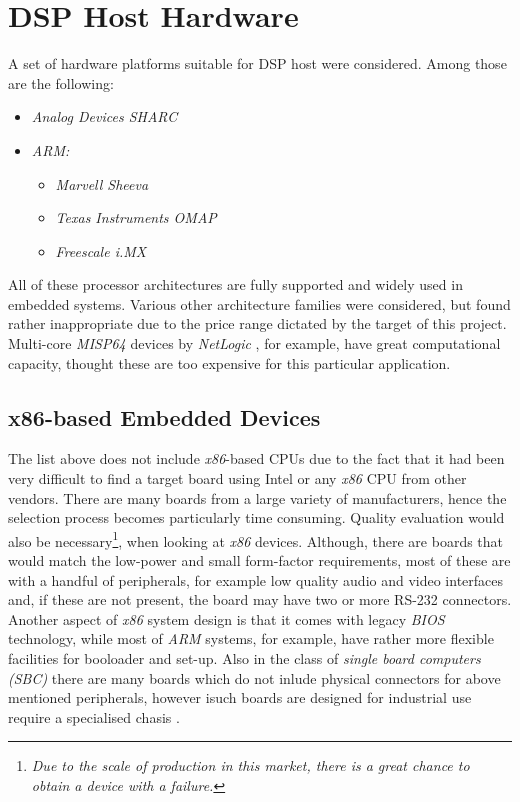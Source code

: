 \section{DSP Host Hardware}

  A set of hardware platforms suitable for DSP host were considered.
 Among those are the following:
 	\begin{itemize}
		\item \emph{Analog Devices SHARC}
		\item \emph{ARM:} \begin{itemize}
		\item \emph{Marvell Sheeva}
		\item \emph{Texas Instruments OMAP}
		\item \emph{Freescale i.MX}
		\end{itemize}
	\end{itemize}
 All of these processor architectures are fully supported and widely
 used in embedded systems. Various other architecture families were
 considered, but found rather inappropriate due to the price range
 dictated by the target of this project. Multi-core \emph{MISP64}
 devices by \emph{NetLogic} \cite{netlogic:mips64:multicore}, for
 example, have great computational capacity, thought these are too
 expensive for this particular application.

\subsection{x86-based Embedded Devices}

  The list above does not include \emph{x86}-based CPUs due to the
 fact that it had been very difficult to find a target board using
 Intel or any \emph{x86} CPU from other vendors. There are many boards
 from a large variety of manufacturers, hence the selection process
 becomes particularly time consuming. Quality evaluation would also
 be necessary\footnote{\emph{Due to the scale of production in this
 market, there is a great chance to obtain a device with a failure.}},
 when looking at \emph{x86} devices. Although, there are boards that
 would match the low-power and small form-factor requirements, most
 of these are with a handful of peripherals, for example low quality
 audio and video interfaces and, if these are not present, the board
 may have two or more RS-232 connectors. Another aspect of \emph{x86}
 system design is that it comes with legacy \emph{BIOS} technology,
 while most of \emph{ARM} systems, for example, have rather more
 flexible facilities for booloader and set-up. Also in the class of
 \emph{single board computers (SBC)} there are many boards which do
 not inlude physical connectors for above mentioned peripherals,
 however isuch boards are designed for industrial use require a
 specialised chasis \cite{links:linuxfordevices:guide}.

